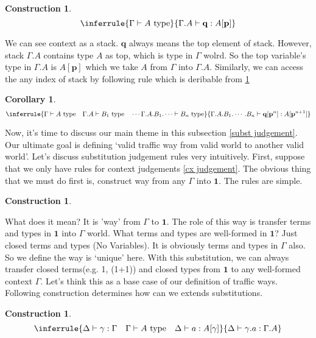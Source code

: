 \documentclass[12pt, letterpaper]{amsart}
\newtheorem{cor}[thm]{Corollary}
\theoremstyle{definition}
\newtheorem{con}[thm]{Construction}
\theoremstyle{remark}
\theoremstyle{plain}
\numberwithin{equation}{section}
\begin{document}
\begin{con}\label{con 1.3.7.}
\[
\inferrule
{\Gamma \vdash A \text{ type}}
{\Gamma.A \vdash \mathbf{q} : A[\mathbf{p}]}
\]
\end{con}
We can see context as a stack. $\mathbf{q}$ always means the top element of stack. 
However, stack $\Gamma.A$ contains type $A$ as top, which is type in $\Gamma$ wolrd. So 
the top variable's type in $\Gamma.A$ is $A[\mathbf{p}]$ which we take $A$ from $\Gamma$ into $\Gamma.A$. Similarly, we can 
access the any index of stack by following rule which is deribable from \ref{con 1.3.7.} 
\begin{cor}
\[
\inferrule
{\Gamma \vdash A \text{ type} \quad \Gamma.A \vdash B_1 \text{ type} \quad \cdots \Gamma.A.B_1.\cdots \vdash B_n \text{ type}}
{\Gamma.A.B_1.\cdots.B_n \vdash \mathbf{q}[\mathbf{p}^n] : A[\mathbf{p}^{n+1}]}
\]
\end{cor}
\newpage
Now, it's time to discuss our main theme in this subsection \ref{subst judgement}.
Our ultimate goal is defining \lq valid traffic way from valid world to another valid world'. Let's discuss substitution 
judgement rules very intuitively. First, suppose that we only have rules for context judgements \ref{cx judgement}. 
The obvious thing that we must do first is, construct way from any $\Gamma$ into $\mathbf{1}$. The rules are simple. 
\begin{con}
\end{con}
\vspace{4mm}
What does it mean? It is 'way' from $\Gamma$ to $\mathbf{1}$. The role of this way is transfer terms and types in $\mathbf{1}$ into $\Gamma$ world. 
What terms and types are well-formed in $\mathbf{1}$? Just closed terms and types (No Variables). It is obviously 
terms and types in $\Gamma$ also. So we define the way is \lq unique' here. With this substitution, 
we can always transfer closed terms(e.g. 1, (1+1)) and closed types from $\mathbf{1}$ to any well-formed context $\Gamma$.  
Let's think this as a base case of our definition of traffic ways. Following construction determines how can we extends substitutions. 
\vspace{4mm}
\begin{con}\label{subst extend}
\[\inferrule
{\Delta \vdash \gamma : \Gamma \quad \Gamma \vdash A \text{ type} \quad \Delta \vdash a : A[\gamma]}
{\Delta \vdash \gamma.a : \Gamma.A}\]
\end{con}
\end{document}

